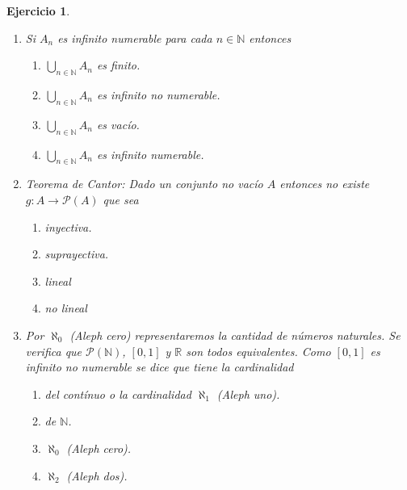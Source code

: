 \documentclass[twoside,12pt,a4 paper,openright]{book}
\newtheorem{ejer}[claim]{Ejercicio}
\begin{document}
\begin{ejer}
\begin{enumerate}
\newpage


\item Si $A_n$ es infinito numerable para cada $n\in \mathbb N $ entonces 
          {\small
    \begin{enumerate}
\item[\textcolor{red}{$\bullet$}] {}
$\bigcup_{n\in \mathbb N} A_n$ es finito. 
\item[\textcolor{blue}{$\bullet$}] {}
$\bigcup_{n\in \mathbb N} A_n$ es infinito no numerable. 
\item[\textcolor{yellow}{$\bullet$}] {}
$\bigcup_{n\in \mathbb N} A_n$ es vac\'io. 
\item[\textcolor{green}{$\bullet$}] {}
$\bigcup_{n\in \mathbb N} A_n$ es infinito numerable. 
\end{enumerate}
}

\newpage


\item  Teorema de Cantor:
Dado un conjunto no vac\'io  $A$ entonces no existe $g: A \to \mathcal P(A)$  que sea 
          {\small
    \begin{enumerate}
\item[\textcolor{red}{$\bullet$}] {}  inyectiva.
\item[\textcolor{blue}{$\bullet$}] {} suprayectiva.
\item[\textcolor{yellow}{$\bullet$}] {} lineal
\item[\textcolor{green}{$\bullet$}] {} no lineal
\end{enumerate}
}
 
\newpage


\item Por $\aleph_0$ (Aleph cero) representaremos la cantidad de n\'umeros naturales. Se verifica que $\mathcal P(\mathbb N)$, $[0,1]$ y $\mathbb R$ son todos equivalentes. Como $[0,1] $ es infinito no numerable se dice que tiene la cardinalidad 
          {\small
    \begin{enumerate}
\item[\textcolor{red}{$\bullet$}] {}  del cont\'inuo o la cardinalidad   $\aleph_1$ (Aleph uno).
\item[\textcolor{blue}{$\bullet$}] {}  de $\mathbb N$.
\item[\textcolor{yellow}{$\bullet$}] {}  $\aleph_0$ (Aleph cero).
\item[\textcolor{green}{$\bullet$}] {}   $\aleph_2$ (Aleph dos).
\end{enumerate}
}


\newpage



\end{enumerate}
\end{ejer}
\end{document}
